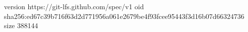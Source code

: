 version https://git-lfs.github.com/spec/v1
oid sha256:ed67c39b716f63d2d771956a061e2679be4f93fcee95443f3d16b07d66324736
size 388144
